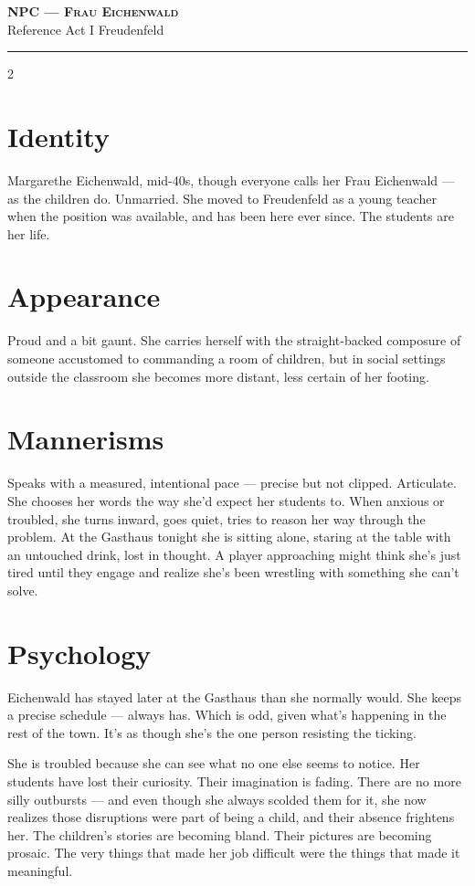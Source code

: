 \documentclass[10pt,letterpaper]{article}
\newcommand{\sceneheader}[4]{%
  \fancyhead[L]{\small\textcolor{accent}{\scshape #1}}%
  \fancyhead[R]{\small\textcolor{accent}{#2 \quad \textbullet \quad #3}}%
  \begin{center}
  {\LARGE\bfseries\scshape\textcolor{accent}{#1}}\\[2pt]
  {\small #2 \quad \textbullet \quad #3 \quad \textbullet \quad #4}\\[2pt]
  \textcolor{rulecol}{\rule{0.5\textwidth}{0.8pt}}
  \end{center}
  \vspace{-4pt}
}
\begin{document}

\label{sec:npc-eichenwald}\sceneheader{NPC --- Frau Eichenwald}{Reference}{Act I}{Freudenfeld}

\begin{multicols}{2}

\section*{Identity}
Margarethe Eichenwald, mid-40s, though everyone calls her Frau Eichenwald --- as the children do. Unmarried. She moved to Freudenfeld as a young teacher when the position was available, and has been here ever since. The students are her life.

\section*{Appearance}
Proud and a bit gaunt. She carries herself with the straight-backed composure of someone accustomed to commanding a room of children, but in social settings outside the classroom she becomes more distant, less certain of her footing.

\section*{Mannerisms}
Speaks with a measured, intentional pace --- precise but not clipped. Articulate. She chooses her words the way she'd expect her students to. When anxious or troubled, she turns inward, goes quiet, tries to reason her way through the problem. At the Gasthaus tonight she is sitting alone, staring at the table with an untouched drink, lost in thought. A player approaching might think she's just tired until they engage and realize she's been wrestling with something she can't solve.

\section*{Psychology}
Eichenwald has stayed later at the Gasthaus than she normally would. She keeps a precise schedule --- always has. Which is odd, given what's happening in the rest of the town. It's as though she's the one person resisting the ticking.

She is troubled because she can see what no one else seems to notice. Her students have lost their curiosity. Their imagination is fading. There are no more silly outbursts --- and even though she always scolded them for it, she now realizes those disruptions were part of being a child, and their absence frightens her. The children's stories are becoming bland. Their pictures are becoming prosaic. The very things that made her job difficult were the things that made it meaningful.


\end{multicols}
\end{document}
